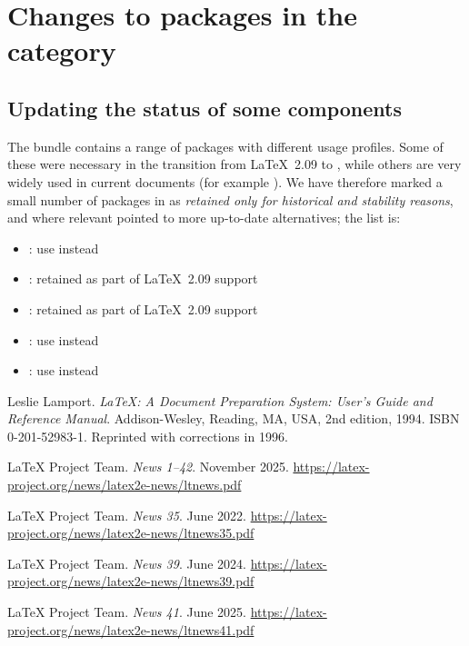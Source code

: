 \documentclass{ltnews}
\begin{document}
\section{Changes to packages in the  category}

\subsection{Updating the status of some components}

The  bundle contains a range of packages with different usage
profiles. Some of these were necessary in the transition from \LaTeX{}~2.09 to
\LaTeXe{}, while others are very widely used in current documents (for example
). We have therefore marked a small number of packages in
 as \emph{retained only for historical and stability reasons}, and
where relevant pointed to more up-to-date alternatives; the list is:
\begin{itemize}
  \item {}: use  instead
  \item {}: retained as part of \LaTeX{}~2.09 support
  \item {}: retained as part of \LaTeX{}~2.09 support
  \item {}: use  instead
  \item {}: use  instead
\end{itemize}


\begin{thebibliography}{9}\frenchspacing


Leslie Lamport.
\newblock \emph{{\LaTeX}: {A} Document Preparation System: User's Guide and Reference
  Manual}.
\newblock \mbox{Addison}-Wesley, Reading, MA, USA, 2nd edition, 1994.
\newblock ISBN 0-201-52983-1.
\newblock Reprinted with corrections in 1996.

 \LaTeX{} Project Team.
  \emph{\LaTeXe{} News 1--42}. November 2025.
  \url{https://latex-project.org/news/latex2e-news/ltnews.pdf}

 \LaTeX{} Project Team.
  \emph{\LaTeXe{} News 35}. June 2022.
  \url{https://latex-project.org/news/latex2e-news/ltnews35.pdf}

 \LaTeX{} Project Team.
  \emph{\LaTeXe{} News 39}. June 2024.
  \url{https://latex-project.org/news/latex2e-news/ltnews39.pdf}

 \LaTeX{} Project Team.
  \emph{\LaTeXe{} News 41}. June 2025.
  \url{https://latex-project.org/news/latex2e-news/ltnews41.pdf}

\end{thebibliography}
\end{document}
